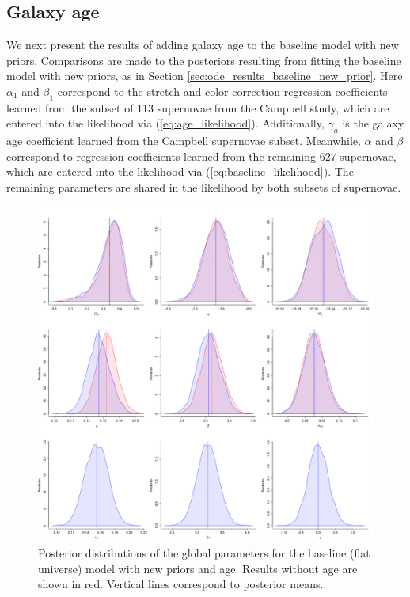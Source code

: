 \subsection{Galaxy age}
\label{sec:ode_results_age}

We next present the results of adding galaxy age to the baseline model with new priors. Comparisons are made to the posteriors resulting from fitting the baseline model with new priors, as in Section \ref{sec:ode_results_baseline_new_prior}. Here $\alpha_1$ and $\beta_1$ correspond to the stretch and color correction regression coefficients learned from the subset of 113 supernovae from the Campbell study, which are entered into the likelihood via (\ref{eq:age_likelihood}). Additionally, $\gamma_{a}$ is the galaxy age coefficient learned from the Campbell supernovae subset. Meanwhile, $\alpha$ and $\beta$ correspond to regression coefficients learned from the remaining 627 supernovae, which are entered into the likelihood via (\ref{eq:baseline_likelihood}). The remaining parameters are shared in the likelihood by both subsets of supernovae. 

\begin{figure}
\centering
	\includegraphics[width=\textwidth]{figures/ode/split_age_flat_camp.png}
\caption{Posterior distributions of the global parameters for the baseline (flat universe) model with new priors and age. Results without age are shown in red. Vertical lines correspond to posterior means.}
\label{fig:ode_age_flat}
\end{figure}

